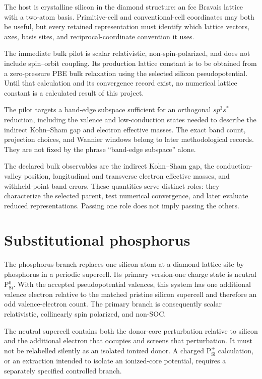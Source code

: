 The host is crystalline silicon in the diamond structure: an fcc Bravais
lattice with a two-atom basis. Primitive-cell and conventional-cell coordinates
may both be useful, but every retained representation must identify which
lattice vectors, axes, basis sites, and reciprocal-coordinate convention it
uses.

The immediate bulk pilot is scalar relativistic, non-spin-polarized, and does
not include spin--orbit coupling. Its production lattice constant is to be
obtained from a zero-pressure PBE bulk relaxation using the selected silicon
pseudopotential. Until that calculation and its convergence record exist, no
numerical lattice constant is a calculated result of this project.

The pilot targets a band-edge subspace sufficient for an orthogonal
$sp^3s^{\ast}$ reduction, including the valence and low-conduction states needed
to describe the indirect Kohn--Sham gap and electron effective masses. The
exact band count, projection choices, and Wannier windows belong to later
methodological records. They are not fixed by the phrase ``band-edge
subspace'' alone.

The declared bulk observables are the indirect Kohn--Sham gap, the
conduction-valley position, longitudinal and transverse electron effective
masses, and withheld-point band errors. These quantities serve distinct roles:
they characterize the selected parent, test numerical convergence, and later
evaluate reduced representations. Passing one role does not imply passing the
others.

\section{Substitutional phosphorus}

The phosphorus branch replaces one silicon atom at a diamond-lattice site by
phosphorus in a periodic supercell. Its primary version-one charge state is
neutral P$_\mathrm{Si}^{0}$. With the accepted pseudopotential valences, this
system has one additional valence electron relative to the matched pristine
silicon supercell and therefore an odd valence-electron count. The primary
branch is consequently scalar relativistic, collinearly spin polarized, and
non-SOC.

The neutral supercell contains both the donor-core perturbation relative to
silicon and the additional electron that occupies and screens that perturbation.
It must not be relabelled silently as an isolated ionized donor. A charged
P$_\mathrm{Si}^{+}$ calculation, or an extraction intended to isolate an
ionized-core potential, requires a separately specified controlled branch.


